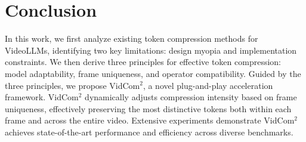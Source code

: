 \section{Conclusion}
\label{sec:Conclusion}

In this work, we first analyze existing token compression methods for VideoLLMs, identifying two key limitations: design myopia and implementation constraints. We then derive three principles for effective token compression: model adaptability, frame uniqueness, and operator compatibility. Guided by the three principles, we propose VidCom$^2$, a novel plug-and-play acceleration framework. VidCom$^2$ dynamically adjusts compression intensity based on frame uniqueness, effectively preserving the most distinctive tokens both within each frame and across the entire video. Extensive experiments demonstrate VidCom$^2$ achieves state-of-the-art performance and efficiency across diverse benchmarks.





